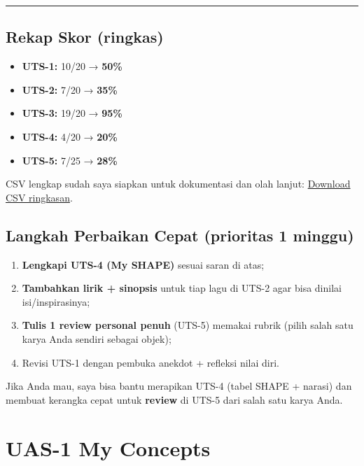 \documentclass[
  letterpaper,
  DIV=11,
  numbers=noendperiod]{scrreprt}
\providecommand{\tightlist}{%
  \setlength{\itemsep}{0pt}\setlength{\parskip}{0pt}}
\begin{document}
\begin{center}\rule{0.5\linewidth}{0.5pt}\end{center}

\section{Rekap Skor (ringkas)}\label{rekap-skor-ringkas}

\begin{itemize}
\tightlist
\item
  \textbf{UTS-1:} 10/20 → \textbf{50\%}
\item
  \textbf{UTS-2:} 7/20 → \textbf{35\%}
\item
  \textbf{UTS-3:} 19/20 → \textbf{95\%}
\item
  \textbf{UTS-4:} 4/20 → \textbf{20\%}
\item
  \textbf{UTS-5:} 7/25 → \textbf{28\%}
\end{itemize}

CSV lengkap sudah saya siapkan untuk dokumentasi dan olah lanjut:
\href{sandbox:/mnt/data/UTS_self_assessment.csv}{Download CSV
ringkasan}.

\section{Langkah Perbaikan Cepat (prioritas 1
minggu)}\label{langkah-perbaikan-cepat-prioritas-1-minggu}

\begin{enumerate}
\def\labelenumi{\arabic{enumi}.}
\tightlist
\item
  \textbf{Lengkapi UTS-4 (My SHAPE)} sesuai saran di atas;
\item
  \textbf{Tambahkan lirik + sinopsis} untuk tiap lagu di UTS-2 agar bisa
  dinilai isi/inspirasinya;
\item
  \textbf{Tulis 1 review personal penuh} (UTS-5) memakai rubrik (pilih
  salah satu karya Anda sendiri sebagai objek);
\item
  Revisi UTS-1 dengan pembuka anekdot + refleksi nilai diri.
\end{enumerate}

Jika Anda mau, saya bisa bantu merapikan UTS-4 (tabel SHAPE + narasi)
dan membuat kerangka cepat untuk \textbf{review} di UTS-5 dari salah
satu karya Anda.


\chapter{UAS-1 My Concepts}\label{uas-1-my-concepts}
\end{document}

